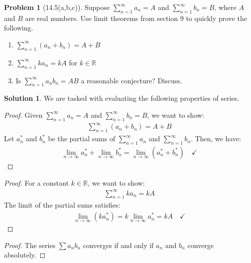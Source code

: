 \documentclass[12pt]{article}
\theoremstyle{definition} %
\newtheorem{solution}{Solution}
\newtheorem{problem}{Problem}
\theoremstyle{plain} %
\begin{document}
\begin{problem}[14.5(a,b,c)]
   Suppose $\sum_{n=1}^{\infty} a_{n} =A$ and $\sum_{n=1}^{\infty} b_{n} =B$, where $A$ and $B$ are real numbers. Use limit theorems from section $9$ to quickly prove the following.
   \begin{enumerate}
    \item $\sum_{n=1}^{\infty} (a_{n} +b_{n}  )=A+B$
    \item $\sum_{n=1}^{\infty} ka_{n} =kA$ for $k\in \mathbb{{R}} $   
    \item Is $\sum_{n=1}^{\infty} a_{n}b_{n} =AB$ a reasonable conjecture? Discuss.  
   \end{enumerate}  
\end{problem}
   \begin{solution}
      We are tasked with evaluating the following properties of series.
      
      \begin{enumerate}
          \item \begin{proof}
            Given $ \sum_{n=1}^{\infty} a_n = A $ and $ \sum_{n=1}^{\infty} b_n = B $, we want to show:
            \begin{align}
            \sum_{n=1}^{\infty} (a_n + b_n) = A + B
            \end{align}
            Let $ a_n^* $ and $ b_n^* $ be the partial sums of $ \sum_{n=1}^{\infty} a_n $ and $ \sum_{n=1}^{\infty} b_n $. Then, we have:
            \begin{align}
            \lim_{n \to \infty} a_n^* + \lim_{n \to \infty} b_n^* = \lim_{n \to \infty} (a_n^* + b_n^*) \quad \checkmark
            \end{align}
            
            
          \end{proof}
          \item \begin{proof}
            \item For a constant $ k \in \mathbb{R} $, we want to show:
            \begin{align}
            \sum_{n=1}^{\infty} k a_n = kA
            \end{align}
            The limit of the partial sums satisfies:
            \begin{align}
            \lim_{n \to \infty} (k a_n^*) = k \lim_{n \to \infty} a_n^* = kA \quad \checkmark
            \end{align}  
          \end{proof}
          \item \begin{proof}
            The series $ \sum a_nb_n $ converges if and only if $a_{n}$ and $b_{n}$ converge absolutely. 
          \end{proof}
      \end{enumerate}
      
      \end{solution}
\end{document}
